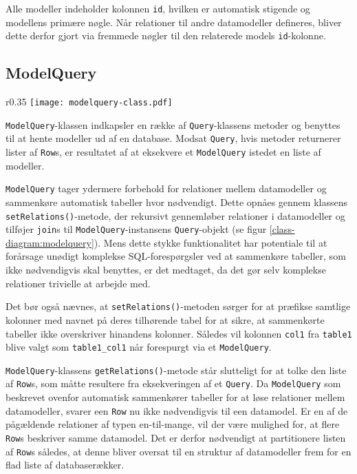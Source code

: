 Alle modeller indeholder kolonnen \texttt{id}, hvilken er automatisk stigende og modellens primære nøgle. Når relationer til andre datamodeller defineres, bliver dette derfor gjort via fremmede nøgler til den relaterede models \texttt{id}-kolonne.

\subsection{ModelQuery}

\begin{wrapfigure}{r}{0.35\textwidth}
  \centering
  \texttt{[image: modelquery-class.pdf]}
  \caption{Klassediagram for \texttt{ModelQuery}}
  \label{class-diagram:modelquery}
\end{wrapfigure}

\texttt{ModelQuery}-klassen indkapsler en række af \texttt{Query}-klassens metoder og benyttes til at hente modeller ud af en database. Modsat \texttt{Query}, hvis metoder returnerer lister af \texttt{Row}s, er resultatet af at eksekvere et \texttt{ModelQuery} istedet en liste af modeller.

\texttt{ModelQuery} tager ydermere forbehold for relationer mellem datamodeller og sammenkøre automatisk tabeller hvor nødvendigt. Dette opnåes gennem klassens \texttt{setRelations()}-metode, der rekursivt gennemløber relationer i datamodeller og tilføjer \texttt{join}s til \texttt{ModelQuery}-instansens \texttt{Query}-objekt (se figur \ref{class-diagram:modelquery}). Mens dette stykke funktionalitet har potentiale til at forårsage unødigt komplekse SQL-forespørgsler ved at sammenkøre tabeller, som ikke nødvendigvis skal benyttes, er det medtaget, da det gør selv komplekse relationer trivielle at arbejde med.

Det bør også nævnes, at \texttt{setRelations()}-metoden sørger for at præfikse samtlige kolonner med navnet på deres tilhørende tabel for at sikre, at sammenkørte tabeller ikke overskriver hinandens kolonner. Således vil kolonnen \texttt{col1} fra \texttt{table1} blive valgt som \texttt{table1\_col1} når forespurgt via et \texttt{ModelQuery}.

\texttt{ModelQuery}-klassens \texttt{getRelations()}-metode står slutteligt for at tolke den liste af \texttt{Row}s, som måtte resultere fra eksekveringen af et \texttt{Query}. Da \texttt{ModelQuery} som beskrevet ovenfor automatisk sammenkører tabeller for at løse relationer mellem datamodeller, svarer een \texttt{Row} nu ikke nødvendigvis til een datamodel. Er en af de pågældende relationer af typen en-til-mange, vil der være mulighed for, at flere \texttt{Row}s beskriver samme datamodel. Det er derfor nødvendigt at partitionere listen af \texttt{Row}s således, at denne bliver oversat til en struktur af datamodeller frem for en flad liste af databaserækker.

